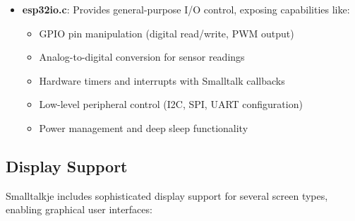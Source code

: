 \documentclass[12pt,a4paper]{report}
\begin{document}
\begin{itemize}
    \item \textbf{esp32io.c}: Provides general-purpose I/O control, exposing capabilities like:
    \begin{itemize}
        \item GPIO pin manipulation (digital read/write, PWM output)
        \item Analog-to-digital conversion for sensor readings
        \item Hardware timers and interrupts with Smalltalk callbacks
        \item Low-level peripheral control (I2C, SPI, UART configuration)
        \item Power management and deep sleep functionality
    \end{itemize}
\end{itemize}

\subsection{Display Support}
Smalltalkje includes sophisticated display support for several screen types, enabling graphical user interfaces:
\end{document}
